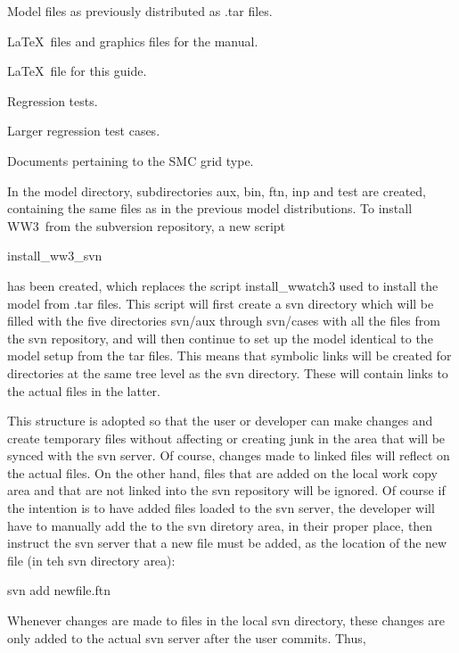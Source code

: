 \documentclass[12pt]{article}
\newcommand{\ws}{WW3}
\newcommand{\file}{\sf}
\newenvironment{flist}{\begin{list}{nofile ?}{\parsep 0mm
            \itemsep 0mm \leftmargin 35mm \labelwidth 25mm
            \rightmargin 10mm}}{\end{list}}
\newcommand{\fit}[2]{\item[{\file{#1}}\hfill]{#2}}
\begin{document}
\begin{flist}
\fit{model    }{Model files as previously distributed as {\file .tar} files.}
\fit{manual   }{\LaTeX\ files and graphics files for the manual.}
\fit{guide    }{\LaTeX\ file for this guide.}
\fit{regtests }{Regression tests.}
\fit{cases    }{Larger regression test cases.}
\fit{smc\_docs }{Documents pertaining to the SMC grid type.}
\end{flist}

\noindent
In the {\file model} directory, subdirectories {\file aux}, {\file bin},
{\file ftn}, {\file inp} and {\file test} are created, containing the same
files as in the previous model distributions. To install \ws\ from the
subversion repository, a new script

\vspace{\baselineskip}
\centerline{\file install\_ww3\_svn}
\vspace{\baselineskip}

\noindent
has been created, which replaces the script {\file install\_wwatch3} used to
install the model from {\file .tar} files. This script will first create a svn
directory which will be filled with the
five directories {\file svn/aux} through {\file svn/cases} with all the files
from the svn repository, and will then continue to set up the model identical
to the model setup from the tar files. This means that symbolic links will be 
created for directories at the same tree level as the svn directory. These will contain
links to the actual files in the latter. 

This structure is adopted so that the user
or developer can make changes and create temporary files without affecting or creating
junk in the area that will be synced with the svn server. Of course, changes made to linked
files will reflect on the actual files. On the other hand, files that are added on the
local work copy area and that are not linked into the svn repository will be ignored.
Of course if the intention is to have added files loaded to the svn server, the developer 
will have to manually add the to the svn diretory area, in their proper place, then instruct 
the svn server that a new file must be added, as the location of the new file (in teh svn directory
area):

\vspace{\baselineskip}
\centerline{\file svn add newfile.ftn}
\vspace{\baselineskip}

Whenever changes are made to files in the local svn directory, these changes are only added
to the actual svn server after the user commits. Thus,
\end{document}
